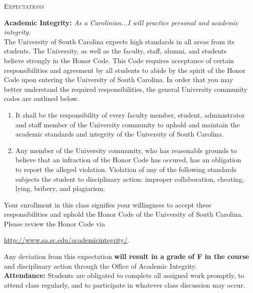 \documentclass[teaching.portfolio.tex]{subfiles}
\begin{document}
\begin{center}
  \textsc{Expectations}
\end{center}

\noindent
\textbf{Academic Integrity:} 
\textit{As a Carolinian...I will practice personal and academic integrity.}\\

\noindent 
The University of South Carolina expects high standards in all areas from its students.
The University, as well as the faculty, staff, alumni, and students believe strongly in the Honor Code.
This Code requires acceptance of certain responsibilities and agreement by all students to abide by the spirit of the Honor Code upon entering the University of South Carolina.
In order that you may better understand the required responsibilities, the general University community codes are outlined below.

\begin{enumerate}
\item
  It shall be the responsibility of every faculty member, student, administrator and staff member of the University community to uphold and maintain the academic standards and integrity of the University of South Carolina.
\item
  Any member of the University community, who has reasonable grounds to believe that an infraction of the Honor Code has occured, has an obligation to report the alleged violation.
  Violation of any of the following standards subjects the student to disciplinary action: improper collaboration, cheating, lying, bribery, and plagiarism.
\end{enumerate}

\noindent
Your enrollment in this class signifies your willingness to accept these responsibilities and uphold the Honor Code of the University of South Carolina.
Please review the Honor Code via
\begin{center}
  \url{http://www.sa.sc.edu/academicintegrity/}.
\end{center}

\noindent
Any deviation from this expectation \textbf{will result in a grade of F in the course} and disciplinary action through the Office of Academic Integrity.\\

\noindent\textbf{Attendance:} 
Students are obligated to complete all assigned work promptly, to attend class regularly, and to participate in whatever class discussion may occur.\\
\end{document}
